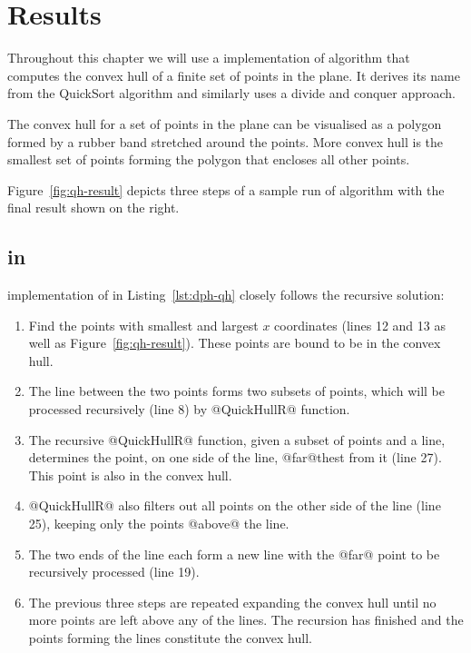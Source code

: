 \documentclass[preamble.tex]{subfiles}
\begin{document}
\clearpage

\chapter{Results}
\label{ch:results}
\label{sec:QuickHull}

Throughout this chapter we will use a  implementation of \QuickHull algorithm that computes the convex hull of a finite set of points in the plane. It derives its name from the QuickSort algorithm and similarly uses a divide and conquer approach.

The convex hull for a set of points in the plane can be visualised as a polygon formed by a rubber band stretched around the points. More convex hull is the smallest set of points forming the polygon that encloses all other points.

Figure~\ref{fig:qh-result} depicts three steps of a sample run of \QuickHull algorithm with the final result shown on the right.


\section{\QuickHull in \DPH}

 implementation of \QuickHull in Listing~\ref{lst:dph-qh} closely follows the recursive solution:
\begin{enumerate}
  \item Find the points with smallest and largest $x$ coordinates (lines 12 and 13 as well as Figure~\ref{fig:qh-result}). These points are bound to be in the convex hull.

  \item The line between the two points forms two subsets of points, which will be processed recursively (line 8) by @QuickHullR@ function.

  \item The recursive @QuickHullR@ function, given a subset of points and a line, determines the point, on one side of the line, @far@thest from it (line 27). This point is also in the convex hull.

  \item @QuickHullR@ also filters out all points on the other side of the line (line 25), keeping only the points @above@ the line.

  \item The two ends of the line each form a new line with the @far@ point to be recursively processed (line 19).

  \item The previous three steps are repeated expanding the convex hull until no more points are left above any of the lines. The recursion has finished and the points forming the lines constitute the convex hull.
\end{enumerate}
\end{document}
